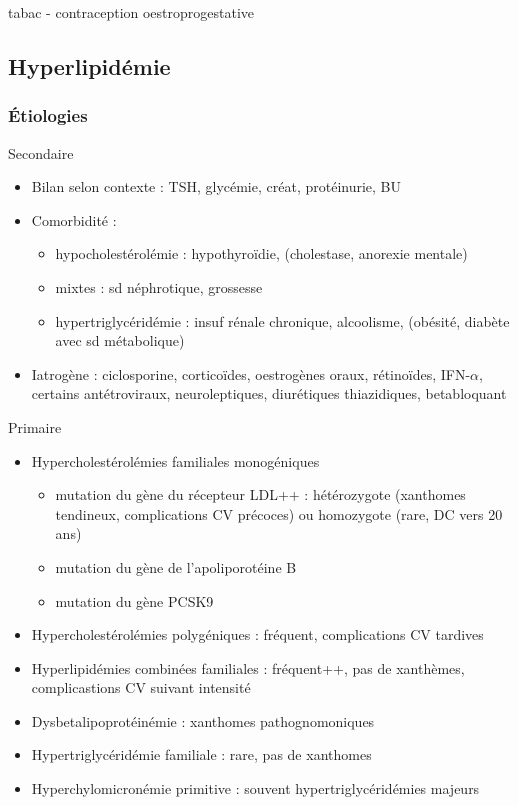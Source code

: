 \documentclass[11pt]{article}
\begin{document}
\danger tabac - contraception oestroprogestative

\subsection{Hyperlipidémie}
\label{sec:orgcd5e267}

\subsubsection{Étiologies}
\label{sec:org01ea318}
Secondaire
\begin{itemize}
\item Bilan selon contexte : TSH, glycémie, créat, protéinurie, BU
\item Comorbidité : 
\begin{itemize}
\item hypocholestérolémie : hypothyroïdie, (cholestase, anorexie mentale)
\item mixtes : sd néphrotique, grossesse
\item hypertriglycéridémie : insuf rénale chronique, alcoolisme, (obésité, diabète
avec sd métabolique)
\end{itemize}
\item Iatrogène : ciclosporine, corticoïdes, oestrogènes oraux, rétinoïdes,
IFN-\(\alpha\), certains antétroviraux, neuroleptiques, diurétiques thiazidiques, betabloquant
\end{itemize}
Primaire
\begin{itemize}
\item Hypercholestérolémies familiales monogéniques
\begin{itemize}
\item mutation du gène du récepteur LDL++ : hétérozygote (xanthomes tendineux,
complications CV précoces) ou homozygote (rare, DC vers 20 ans)
\item mutation du gène de l'apoliporotéine B
\item mutation du gène PCSK9
\end{itemize}
\item Hypercholestérolémies polygéniques : fréquent, complications CV tardives
\item Hyperlipidémies combinées familiales : fréquent++, pas de xanthèmes,
complicastions CV suivant intensité
\item Dysbetalipoprotéinémie : xanthomes pathognomoniques
\item Hypertriglycéridémie familiale : rare, pas de xanthomes
\item Hyperchylomicronémie primitive : souvent hypertriglycéridémies majeurs
\end{itemize}
\end{document}
